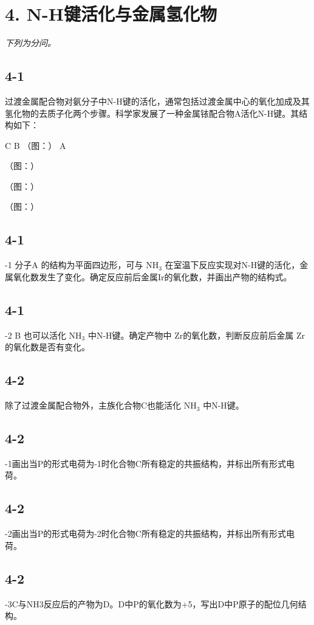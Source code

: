 \section*{4. N-H键活化与金属氢化物}
\textit{下列为分问。}

\subsection*{4-1}
过渡金属配合物对氨分子中N-H键的活化，通常包括过渡金属中心的氧化加成及其氢化物的去质子化两个步骤。科学家发展了一种金属铱配合物A活化N-H键。其结构如下：

C
B
（图：）
A

（图：）

（图：）

（图：）

\subsection*{4-1}
-1 分子A 的结构为平面四边形，可与 $\mathrm { N H } _ { 3 }$ 在室温下反应实现对N-H键的活化，金属氧化数发生了变化。确定反应前后金属Ir的氧化数，并画出产物的结构式。

\subsection*{4-1}
-2 B 也可以活化 $\mathrm { N H } _ { 3 }$ 中N-H键。确定产物中 Zr的氧化数，判断反应前后金属 Zr的氧化数是否有变化。

\subsection*{4-2}
除了过渡金属配合物外，主族化合物C也能活化 $\mathrm { N H } _ { 3 }$ 中N-H键。

\subsection*{4-2}
-1画出当P的形式电荷为-1时化合物C所有稳定的共振结构，并标出所有形式电荷。

\subsection*{4-2}
-2画出当P的形式电荷为-2时化合物C所有稳定的共振结构，并标出所有形式电荷。

\subsection*{4-2}
-3C与NH3反应后的产物为D。D中P的氧化数为+5，写出D中P原子的配位几何结构。

